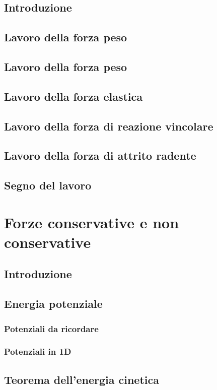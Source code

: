 \documentclass[a4paper]{article}
\begin{document}
\subsection{Introduzione}
\subsection{Lavoro della forza peso}
\subsection{Lavoro della forza peso}
\subsection{Lavoro della forza elastica}
\subsection{Lavoro della forza di reazione vincolare}
\subsection{Lavoro della forza di attrito radente}
\subsection{Segno del lavoro}

\newpage

\section{Forze conservative e non conservative}
\subsection{Introduzione}
\subsection{Energia potenziale}
\subsubsection*{Potenziali da ricordare}
\subsubsection*{Potenziali in 1D}
\subsection{Teorema dell'energia cinetica}
\end{document}
